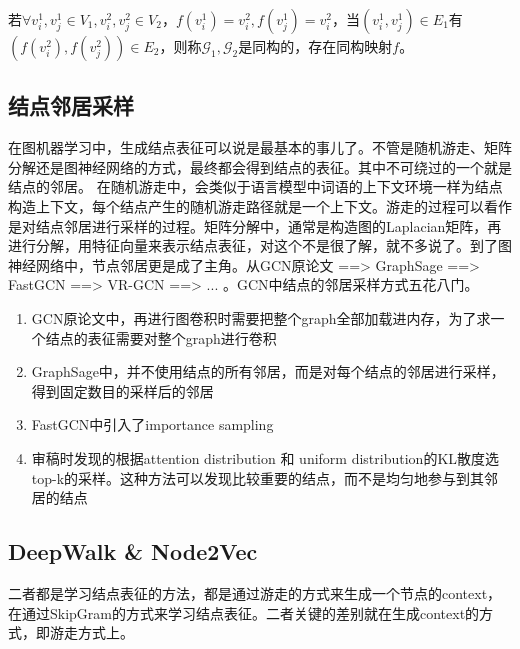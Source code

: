 若$\forall v_i^1, v_j^1 \in V_1, v_i^2, v_j^2 \in V_2$，$f(v_i^1) = v_i^2, f(v_j^1) = v_i^2$，当$(v_i^1, v_j^1) \in E_1$有$( f(v_i^2), f(v_j^2) ) \in E_2$，则称$\mathcal{G}_1, \mathcal{G}_2$是同构的，存在同构映射$f$。

\subsection{结点邻居采样}
在图机器学习中，生成结点表征可以说是最基本的事儿了。不管是随机游走、矩阵分解还是图神经网络的方式，最终都会得到结点的表征。其中不可绕过的一个就是结点的邻居。
在随机游走中，会类似于语言模型中词语的上下文环境一样为结点构造上下文，每个结点产生的随机游走路径就是一个上下文。游走的过程可以看作是对结点邻居进行采样的过程。矩阵分解中，通常是构造图的Laplacian矩阵，再进行分解，用特征向量来表示结点表征，对这个不是很了解，就不多说了。到了图神经网络中，节点邻居更是成了主角。从GCN原论文\cite{kipf2017semi-supervised} ==> GraphSage\cite{hamilton2017inductive} ==> FastGCN\cite{chen2018fastgcn} ==> VR-GCN\cite{chen2018stochastic} ==> ... 。GCN中结点的邻居采样方式五花八门。

\begin{enumerate}
	\item GCN原论文中，再进行图卷积时需要把整个graph全部加载进内存，为了求一个结点的表征需要对整个graph进行卷积
	\item GraphSage中，并不使用结点的所有邻居，而是对每个结点的邻居进行采样，得到固定数目的采样后的邻居
	\item FastGCN中引入了importance sampling
	\item 审稿时发现的根据attention distribution 和 uniform distribution的KL散度选top-k的采样。这种方法可以发现比较重要的结点，而不是均匀地参与到其邻居的结点
\end{enumerate}

\subsection{DeepWalk \& Node2Vec}
二者都是学习结点表征的方法，都是通过游走的方式来生成一个节点的context，在通过SkipGram的方式来学习结点表征。二者关键的差别就在生成context的方式，即游走方式上。

